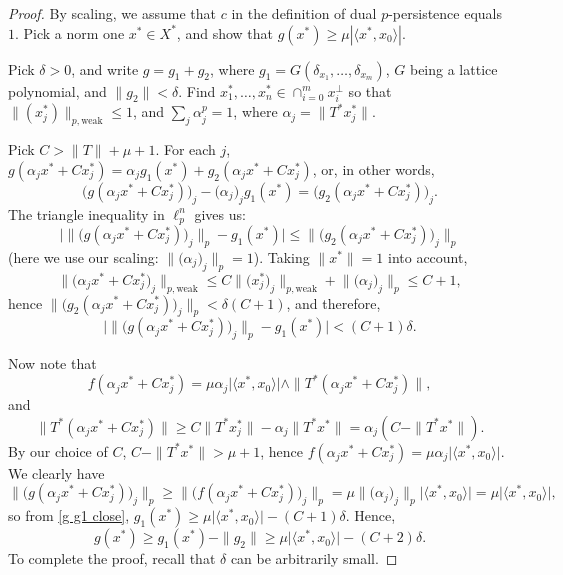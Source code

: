 \documentclass[10pt,a4paper]{amsart}
\begin{document}
\begin{proof}
By scaling, we assume that $c$ in the definition of dual $p$-persistence equals $1$.
Pick a norm one $x^* \in X^*$, and show that $g(x^*) \geq \mu |\langle x^*, x_0\rangle|$. 

Pick $\delta > 0$, and write $g = g_1 + g_2$, where $g_1 = G(\delta_{x_1}, \ldots, \delta_{x_m})$, $G$ being a lattice polynomial, and $\|g_2\| < \delta$.
Find $x_1^*, \ldots, x_n^* \in \cap_{i=0}^m x_i^\perp$ so that $\|(x_j^*)\|_{p,{\textrm{weak}}} \leq 1$, and $\sum_j \alpha_j^p = 1$, where $\alpha_j = \|T^* x_j^*\|$.

Pick $C > \|T\| + \mu + 1$. For each $j$, $g(\alpha_j x^* + C x_j^*) = \alpha_j g_1(x^*) + g_2(\alpha_j x^* + C x_j^*)$, or, in other words,
$$
\big( g(\alpha_j x^* + C x_j^*) \big)_j - \big( \alpha_j \big)_j g_1(x^*) = \big( g_2(\alpha_j x^* + C x_j^*) \big)_j .
$$
The triangle inequality in $\ell_p^n$ gives us:
$$
\Big|\big\| \big( g(\alpha_j x^* + C x_j^*) \big)_j \big\|_p - g_1(x^*) \Big| \leq \big\| \big( g_2(\alpha_j x^* + C x_j^*) \big)_j \big\|_p 
$$
(here we use our scaling: $\big\| \big( \alpha_j \big)_j \big\|_p = 1$). Taking $\|x^*\| = 1$ into account,
$$
\big\| \big( \alpha_j x^* + C x_j^* \big)_j \big\|_{p, {\textrm{weak}}} \leq C \big\| \big( x_j^* \big)_j \big\|_{p, {\textrm{weak}}} + \big\| \big( \alpha_j \big)_j \big\|_p \leq C+1 ,
$$
hence $\big\| \big( g_2(\alpha_j x^* + C x_j^*) \big)_j \big\|_p < \delta (C+1)$, and therefore,
\begin{equation}
\Big|\big\| \big( g(\alpha_j x^* + C x_j^*) \big)_j \big\|_p - g_1(x^*) \Big| < (C+1)\delta .
\label{g g1 close}
\end{equation}

Now note that
$$
f(\alpha_j x^* + C x_j^*) = \mu \alpha_j \big| \langle x^*, x_0 \rangle \big| \wedge \|T^* (\alpha_j x^* + C x_j^*)\| ,
$$
and
$$
\|T^* (\alpha_j x^* + C x_j^*)\| \geq C \|T^* x_j^*\| - \alpha_j \|T^* x^*\| = \alpha_j (C - \|T^*x^*\|) .
$$
By our choice of $C$, $C - \|T^*x^*\| > \mu + 1$, hence $f(\alpha_j x^* + C x_j^*) = \mu \alpha_j \big| \langle x^*, x_0 \rangle \big|$. We clearly have
$$
\big\| \big( g(\alpha_j x^* + C x_j^*) \big)_j \big\|_p \geq \big\| \big( f(\alpha_j x^* + C x_j^*) \big)_j \big\|_p = \mu \big\| \big( \alpha_j \big)_j \big\|_p \big| \langle x^*, x_0 \rangle \big| = \mu \big| \langle x^*, x_0 \rangle \big| ,
$$
so from \eqref{g g1 close}, $g_1(x^*) \geq \mu \big| \langle x^*, x_0 \rangle \big| - (C+1)\delta$. Hence,
$$
g(x^*) \geq g_1(x^*) - \|g_2\| \geq \mu \big| \langle x^*, x_0 \rangle \big| - (C+2)\delta .
$$
To complete the proof, recall that $\delta$ can be arbitrarily small.
\end{proof}
\end{document}
